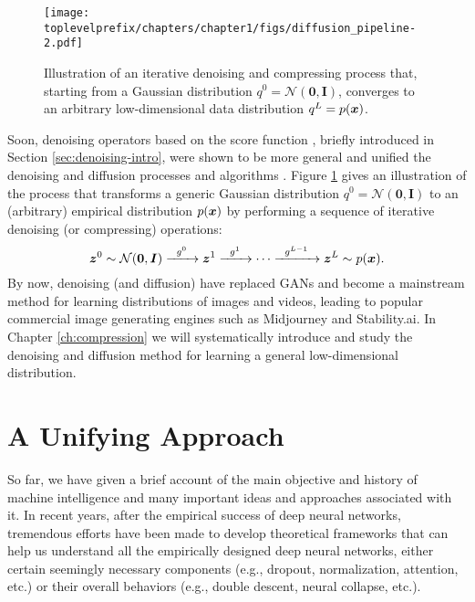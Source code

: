 \documentclass[\toplevelprefix/book-main.tex]{subfiles}
\begin{document}
\begin{figure}[t]
    \centering
    \texttt{[image: \\toplevelprefix/chapters/chapter1/figs/diffusion\_pipeline-2.pdf]}
    \caption{Illustration of an iterative denoising and compressing process that, starting from a Gaussian distribution $q^0 = \mathcal{N}(\boldsymbol{0}, \boldsymbol{I})$, converges to an arbitrary low-dimensional data distribution $q^L = p(\bm{x})$. }
    \label{fig:diffusion}
\end{figure}

Soon, denoising operators based on the score function \cite{hyvarinen05a}, briefly introduced in Section \ref{sec:denoising-intro}, were shown to be more general and unified the denoising and diffusion processes and algorithms \cite{song2019,song2020score,ho2020denoising}. Figure \ref{fig:diffusion} gives an illustration of the process that transforms a generic Gaussian distribution $q^0 = \mathcal{N}(\boldsymbol{0}, \boldsymbol{I})$ to an (arbitrary) empirical distribution $p(\bm{x})$ by performing a sequence of iterative denoising (or compressing) operations:
\begin{equation}
        \bm{z}^0 \sim  \mathcal{N}(\boldsymbol{0}, \boldsymbol{I})\xrightarrow{\hspace{2mm} g^0  \hspace{2mm}} \bm{z}^1 \xrightarrow{\hspace{2mm} g^1 \hspace{2mm}} \cdots \xrightarrow{\hspace{2mm} g^{L-1}  \hspace{2mm}} \bm{z}^L \sim p(\bm{x}).
\end{equation}
By now, denoising (and diffusion) have replaced GANs and become a mainstream method for learning distributions of images and videos, leading to popular commercial image generating engines such as Midjourney and Stability.ai. 
In Chapter \ref{ch:compression} we will systematically introduce and study the denoising and diffusion method for learning a general low-dimensional distribution.  



\section{A Unifying Approach}\label{sec:unifying-approach}
So far, we have given a brief account of the main objective and history of machine intelligence and many important ideas and approaches associated with it. In recent years, after the empirical success of deep neural networks, tremendous efforts have been made to develop theoretical frameworks that can help us understand all the empirically designed deep neural networks, either certain seemingly necessary components (e.g., dropout,  normalization, attention, etc.) or their overall behaviors (e.g., double descent, neural collapse,  etc.). 
\end{document}

